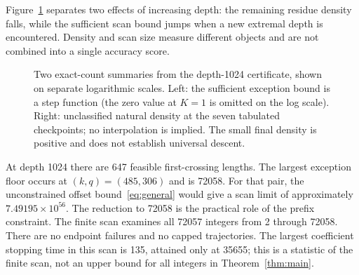 \documentclass[11pt,a4paper]{amsart}
\theoremstyle{definition}
\theoremstyle{remark}
\begin{document}
Figure~\ref{fig:tradeoff} separates two effects of increasing depth:
the remaining residue density falls, while the sufficient scan bound
jumps when a new extremal depth is encountered. Density and scan size
measure different objects and are not combined into a single accuracy score.
\begin{figure}[!ht]
\centering
{}
\caption{Two exact-count summaries from the depth-1024 certificate, shown on separate logarithmic scales. Left: the sufficient exception bound is a step function (the zero value at $K=1$ is omitted on the log scale). Right: unclassified natural density at the seven tabulated checkpoints; no interpolation is implied. The small final density is positive and does not establish universal descent.}
\label{fig:tradeoff}
\end{figure}

At depth 1024 there are 647 feasible first-crossing lengths. The largest
exception floor occurs at $(k,q)=(485,306)$ and is 72058.
For that pair, the unconstrained offset bound~\eqref{eq:general} would
give a scan limit of approximately $7.49195\times10^{56}$.
The reduction to 72058 is the practical role of the prefix constraint.
The finite scan examines all 72057 integers from 2 through 72058.
There are no endpoint failures and no capped trajectories.
The largest coefficient stopping time in this scan is 135, attained only
at 35655; this is a statistic of the finite scan, not an upper bound for
all integers in Theorem~\ref{thm:main}.
\end{document}
